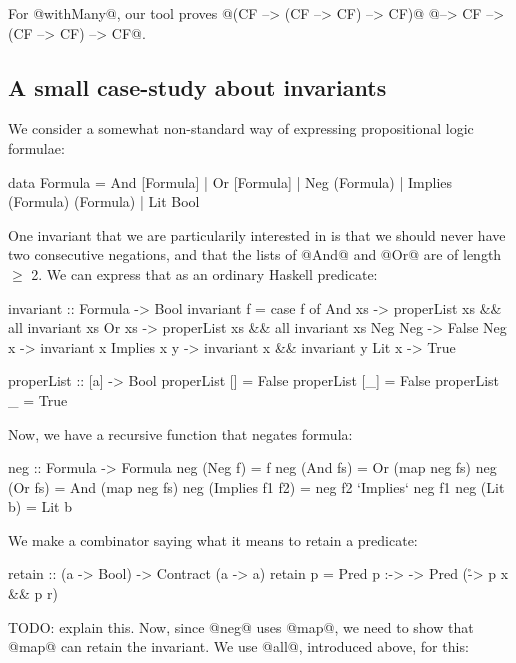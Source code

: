 For @withMany@, our tool proves
@(CF --> (CF --> CF) --> CF)@ @--> CF --> (CF --> CF) --> CF@.

\subsection{A small case-study about invariants}

We consider a somewhat non-standard way of expressing propositional
logic formulae:

\begin{code}
data Formula = And [Formula]
             | Or  [Formula]
             | Neg (Formula)
             | Implies (Formula) (Formula)
             | Lit Bool
\end{code}

One invariant that we are particularily interested in is that we
should never have two consecutive negations, and that the lists of
@And@ and @Or@ are of length $\ge$ 2. We can express that as an ordinary
Haskell predicate:

\begin{code}
invariant :: Formula -> Bool
invariant f = case f of
  And xs      -> properList xs && all invariant xs
  Or xs       -> properList xs && all invariant xs
  Neg Neg{}   -> False
  Neg x       -> invariant x
  Implies x y -> invariant x && invariant y
  Lit x       -> True

properList :: [a] -> Bool
properList []  = False
properList [_] = False
properList _   = True
\end{code}

Now, we have a recursive function that negates formula:

\begin{code}
neg :: Formula -> Formula
neg (Neg f)         = f
neg (And fs)        = Or (map neg fs)
neg (Or fs)         = And (map neg fs)
neg (Implies f1 f2) = neg f2 `Implies` neg f1
neg (Lit b)         = Lit b
\end{code}

We make a combinator saying what it means to retain a predicate:

\begin{code}
retain :: (a -> Bool) -> Contract (a -> a)
retain p = Pred p :-> \x -> Pred (\r -> p x && p r)
\end{code}

TODO: explain this. Now, since @neg@ uses @map@, we need to show that
@map@ can retain the invariant. We use @all@, introduced above, for
this:

